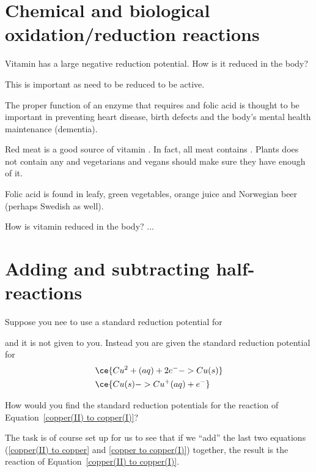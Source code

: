 \documentclass[../mit-general-chemistry.tex]{subfiles}
\begin{document}
\section{Chemical and biological oxidation/reduction reactions}


Vitamin  has a large negative reduction potential. How is it
reduced in the body?

This is important as  need to be reduced to be active.

The proper function of an enzyme that requires  and folic acid
is thought to be important in preventing heart disease, birth defects
and the body's mental health maintenance (dementia).

Red meat is a good source of vitamin . In fact, all meat
contains . Plants does not contain any  and
vegetarians and vegans should make sure they have enough of it.

Folic acid is found in leafy, green vegetables, orange juice and
Norwegian beer (perhaps Swedish as well).

How is vitamin  reduced in the body? ...






\section{Adding and subtracting half-reactions}



Suppose you nee to use a standard reduction potential for


and it is not given to you. Instead you are given the standard
reduction potential for
\begin{align}
  &\ce{Cu^2+(aq) + 2e^- -> Cu(s)\label{copper(II) to copper}}\\
  &\ce{Cu(s) -> Cu^+(aq) + e^-\label{copper to copper(I)}}
\end{align}

How would you find the standard reduction potentials for
the reaction of Equation~\ref{copper(II) to copper(I)}?

The task is of course set up for us to see that if we ``add'' the last
two equations (\ref{copper(II) to copper} and \ref{copper to
  copper(I)}) together, the result is the reaction of
Equation~\ref{copper(II) to copper(I)}.
\end{document}
